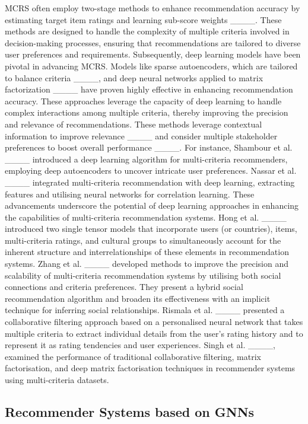     MCRS often employ two-stage methods to enhance recommendation accuracy by estimating target item ratings and learning sub-score weights ____. These methods are designed to handle the complexity of multiple criteria involved in decision-making processes, ensuring that recommendations are tailored to diverse user preferences and requirements. Subsequently, deep learning models have been pivotal in advancing MCRS. Models like sparse autoencoders, which are tailored to balance criteria ____, and deep neural networks applied to matrix factorization ____  have proven highly effective in enhancing recommendation accuracy. These approaches leverage the capacity of deep learning to handle complex interactions among multiple criteria, thereby improving the precision and relevance of recommendations. These methods leverage contextual information to improve relevance ____ and consider multiple stakeholder preferences to boost overall performance ____. For instance, Shambour et al. ____ introduced a deep learning algorithm for multi-criteria recommenders, employing deep autoencoders to uncover intricate user preferences. Nassar et al. ____ integrated multi-criteria recommendation with deep learning, extracting features and utilising neural networks for correlation learning. These advancements underscore the potential of deep learning approaches in enhancing the capabilities of multi-criteria recommendation systems. Hong et al. ____ introduced two single tensor models that incorporate users (or countries), items, multi-criteria ratings, and cultural groups to simultaneously account for the inherent structure and interrelationships of these elements in recommendation systems. Zhang et al. ____ developed methods to improve the precision and scalability of multi-criteria recommendation systems by utilising both social connections and criteria preferences. They present a hybrid social recommendation algorithm and broaden its effectiveness with an implicit technique for inferring social relationships. Rismala et al. ____ presented a collaborative filtering approach based on a personalised neural network that takes multiple criteria to extract individual details from the user's rating history and to represent it as rating tendencies and user experiences. Singh et al. ____, examined the performance of traditional collaborative filtering, matrix factorisation, and deep matrix factorisation techniques in recommender systems using multi-criteria datasets.
    
\subsection{Recommender Systems based on GNNs}

